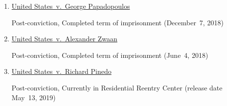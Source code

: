 \begin{enumerate}[1.]

    \item \underline{United States~v.\ George Papadopoulos}

Post-conviction, Completed term of imprisonment (December~7, 2018)

    \item \underline{United States~v.\ Alexander Zwaan}

Post-conviction, Completed term of imprisonment (June~4, 2018)

    \item \underline{United States~v.\ Richard Pinedo}

Post-conviction, Currently in Residential Reentry Center (release date May~13, 2019)

\end{enumerate}
